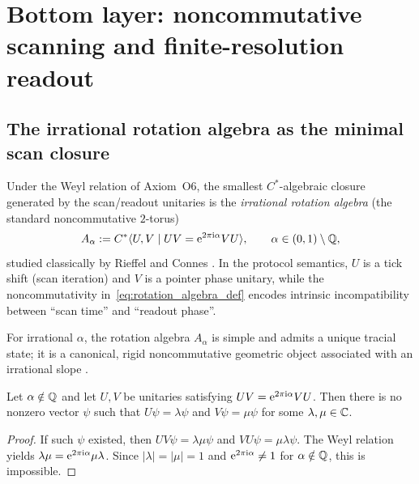 
\section{Bottom layer: noncommutative scanning and finite-resolution readout}
\label{sec:noncommutative_scanning_readout}

\subsection{The irrational rotation algebra as the minimal scan closure}
\label{sec:rotation_algebra}

Under the Weyl relation of Axiom~O6, the smallest $C^\ast$-algebraic closure generated by the scan/readout unitaries is the \emph{irrational rotation algebra} (the standard noncommutative $2$-torus)
\begin{equation}
\label{eq:rotation_algebra_def}
A_\alpha := C^\ast\langle U,V \mid UV=\mathrm{e}^{2\pi \mathrm{i} \alpha}VU\rangle,\qquad \alpha\in(0,1)\setminus\mathbb{Q},
\end{equation}
studied classically by Rieffel and Connes \cite{Rieffel1981,Connes1994}.
In the protocol semantics, $U$ is a tick shift (scan iteration) and $V$ is a pointer phase unitary, while the noncommutativity in~\eqref{eq:rotation_algebra_def} encodes intrinsic incompatibility between ``scan time'' and ``readout phase''.

\begin{remark}
For irrational $\alpha$, the rotation algebra $A_\alpha$ is simple and admits a unique tracial state; it is a canonical, rigid noncommutative geometric object associated with an irrational slope \cite{Rieffel1981,Connes1994}.
\end{remark}

\begin{proposition}
\label{prop:no_simultaneous_eigenvector}
Let $\alpha\notin\mathbb{Q}$ and let $U,V$ be unitaries satisfying $UV=\mathrm{e}^{2\pi\mathrm{i}\alpha}VU$. Then there is no nonzero vector $\psi$ such that $U\psi=\lambda\psi$ and $V\psi=\mu\psi$ for some $\lambda,\mu\in\mathbb{C}$.
\end{proposition}
\begin{proof}
If such $\psi$ existed, then $UV\psi=\lambda\mu\psi$ and $VU\psi=\mu\lambda\psi$. The Weyl relation yields $\lambda\mu=\mathrm{e}^{2\pi\mathrm{i}\alpha}\mu\lambda$. Since $|\lambda|=|\mu|=1$ and $\mathrm{e}^{2\pi\mathrm{i}\alpha}\neq 1$ for $\alpha\notin\mathbb{Q}$, this is impossible.
\end{proof}

